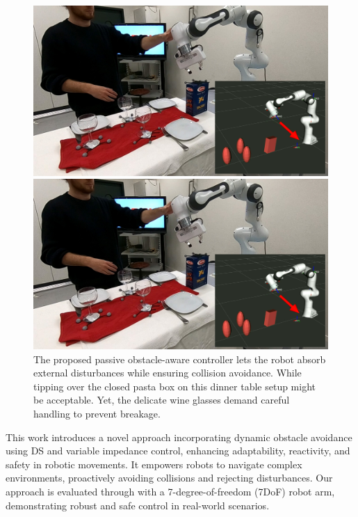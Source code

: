 \begin{figure}
\iflong
\centerline{\includegraphics[width=.95\columnwidth]{figures/robot_arm_table_avoidance}}
\else
\centerline{\includegraphics[width=.7\columnwidth]{figures/robot_arm_table_avoidance}}
\fi
\caption{
The proposed passive obstacle-aware controller lets the robot absorb external disturbances while ensuring collision avoidance. 
While tipping over the closed pasta box on this dinner table setup might be acceptable. Yet, the delicate wine glasses demand careful handling to prevent breakage.
}
\label{fig:table_avoidance_with_obstacle}
\end{figure}

This work introduces a novel approach incorporating dynamic obstacle avoidance using DS and variable impedance control, enhancing adaptability, reactivity, and safety in robotic movements. It empowers robots to navigate complex environments, proactively avoiding collisions and rejecting disturbances. Our approach is evaluated through with a 7-degree-of-freedom (7DoF) robot arm, demonstrating robust and safe control in real-world scenarios.

